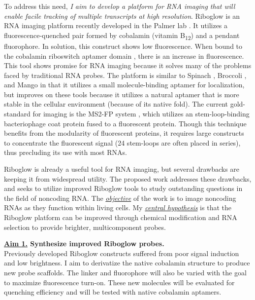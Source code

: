 To address this need, \textit{I aim to develop a platform for RNA imaging that will enable facile tracking of multiple transcripts at high resolution}. Riboglow is an RNA imaging platform recently developed in the Palmer lab \cite{Braselmannmulticolorriboswitchbasedplatform2018}. It utilizes a fluorescence-quenched pair formed by cobalamin (vitamin B\textsubscript{12}) and a pendant fluorophore. In solution, this construct shows low fluorescence. When bound to the cobalamin riboswitch aptamer domain \cite{JohnsonJrB12cofactorsdirectly2012}, there is an increase in fluorescence. This tool shows promise for RNA imaging because it solves many of the problems faced by traditional RNA probes.
The platform is similar to Spinach \cite{PaigeRNAMimicsGreen2011}, Broccoli \cite{FilonovBroccoliRapidSelection2014}, and Mango \cite{AutourFluorogenicRNAMango2018,DolgosheinaRNAMangoAptamerFluorophore2014} in that it utilizes a small molecule-binding aptamer for localization, but improves on these tools because it utilizes a natural aptamer that is more stable in the cellular environment (because of its native fold).
The current gold-standard for imaging is the MS2-FP system \cite{FuscoSinglemRNAMolecules2003}, which utilizes an stem-loop-binding bacteriophage coat protein fused to a fluorescent protein. Though this technique benefits from the modularity of fluorescent proteins, it requires large constructs to concentrate the fluorescent signal (24 stem-loops are often placed in series), thus precluding its use with most RNAs.

Riboglow is already a useful tool for RNA imaging, but several drawbacks are keeping it from widespread utility. The proposed work addresses these drawbacks, and seeks to utilize improved Riboglow tools to study outstanding questions in the field of noncoding RNA. The \underline{\textit{objective}} of the work is to image noncoding RNAs as they function within living cells. My \underline{\textit{central hypothesis}} is that the Riboglow platform can be improved through chemical modification and RNA selection to provide brighter, multicomponent probes.

{\bf \underline{Aim 1.} Synthesize improved Riboglow probes.}\\
Previously developed Riboglow constructs suffered from poor signal induction and low brightness. I aim to derivatize the native cobalamin structure to produce new probe scaffolds. The linker and fluorophore will also be varied with the goal to maximize fluorescence turn-on. These new molecules will be evaluated for quenching efficiency and will be tested with native cobalamin aptamers.

